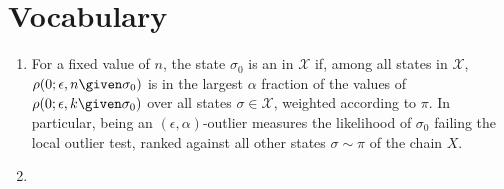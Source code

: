 \documentclass[12pt]{article}
\begin{document}
\section*{Vocabulary}
\begin{enumerate}
  \item     For a fixed value of \( n \), the state \( \sigma_0 \) is an  in \( \mathcal{X} \) if, among all
    states in \( \mathcal{X} \), \( \rho(0; \epsilon, n \given \sigma_{0})
    \) is in the largest \( \alpha \) fraction of the values of \( \rho(0;
    \epsilon, k \given \sigma_{0}) \) over all states \( \sigma \in
    \mathcal{X} \), weighted according to \( \pi \).  In particular,
    being an \( (\epsilon, \alpha) \)-outlier measures the likelihood of
    \( \sigma_0 \) failing the local outlier test, ranked against all
    other states \( \sigma \sim \pi \) of the chain \( X \).
  \item 
\end{enumerate}

\hr
\end{document}
